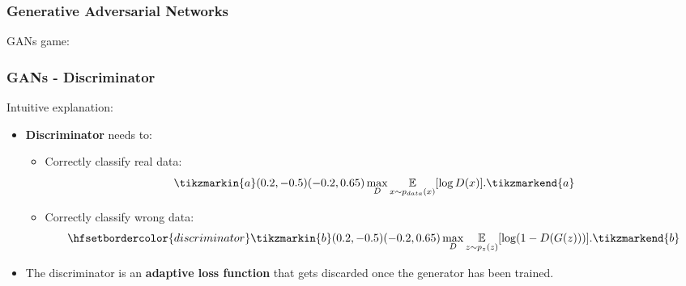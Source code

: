 \documentclass{beamer}
\begin{document}
\begin{frame}
\frametitle{Generative Adversarial Networks}
GANs game:



\end{frame}

\begin{frame}
\frametitle{GANs - Discriminator}
Intuitive explanation:
\begin{itemize}
	\item \textbf{Discriminator} needs to:
	\begin{itemize}
		\item Correctly classify \textcolor{real}{real} data: \\  \begin{equation} \tikzmarkin{a}(0.2,-0.5)(-0.2,0.65) \max_D \underset{x \sim p_{data}(x)}{\mathbb{E}} [\log D(x)].\tikzmarkend{a}
		\end{equation}
		\item Correctly classify \textcolor{generated}{wrong} data: \\ 
		 \begin{equation}
		\hfsetbordercolor{discriminator} \tikzmarkin{b}(0.2,-0.5)(-0.2,0.65) \max_D  \underset{z \sim p_z(z)}{\mathbb{E}}[\log(1 - D(G(z)))].\tikzmarkend{b} \end{equation}
	\end{itemize}
\item The discriminator is an \textbf{adaptive loss function} that gets discarded once the generator has been trained.
\end{itemize}
\end{frame}
\end{document}
